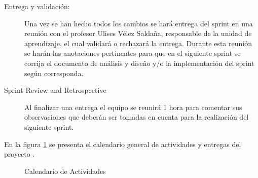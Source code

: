 \begin{description}
				\item[Entrega y validación:] Una vez se han hecho todos los cambios se hará entrega del sprint en una reunión con el profesor Ulises Vélez Saldaña, responsable de la unidad de aprendizaje, el cual validará o rechazará la entrega. Durante esta reunión se harán las anotaciones pertinentes para que en el siguiente sprint se corrija el documento de análisis y diseño y/o la implementación del sprint según corresponda.
				\item[Sprint Review and Retrospective] Al finalizar una entrega el equipo se reunirá 1 hora para comentar sus observaciones que deberán ser tomadas en cuenta para la realización del siguiente sprint.
			\end{description}

En la figura \ref{fig:cal} se presenta el calendario general de actividades y entregas del proyecto \textit{\varProyecto}.


\begin{figure}[hbtp!]
	\begin{center}
		\caption{Calendario de Actividades}
		\label{fig:cal}
	\end{center}
\end{figure}
